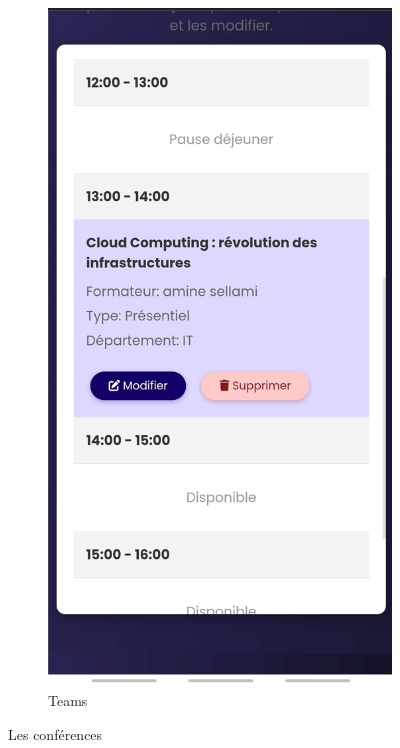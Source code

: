 \documentclass{article}
\begin{document}
\begin{figure}[H]
  \begin{subfigure}[t]{0.3\textwidth}
    \centering
    \includegraphics[width=\textwidth]{picres.jpg}
    \caption{Teams}
    \label{fig:for2}
  \end{subfigure}
  \caption{Les conférences}
\end{figure}
\end{document}
